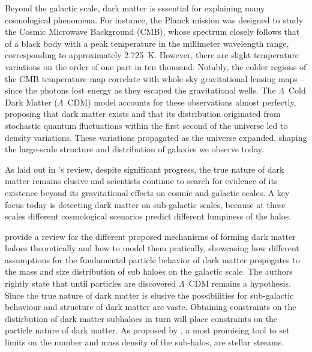 \documentclass{aa}
\begin{document}
  Beyond the galactic scale, dark matter is essential for explaining many cosmological phenomena. For instance, the Planck mission \citep{2020A&A...641A...1P} was designed to study the Cosmic Microwave Background (CMB), whose spectrum closely follows that of a black body with a peak temperature in the millimeter wavelength range, corresponding to approximately 2.725~K. However, there are slight temperature variations on the order of one part in ten thousand. Notably, the colder regions of the CMB temperature map correlate with whole-sky gravitational lensing maps \citep{2020A&A...641A...8P}--since the photons lost energy as they escaped the gravitational wells. The $\Lambda$~Cold Dark Matter ($\Lambda$~CDM) model accounts for these observations almost perfectly, proposing that dark matter exists and that its distribution originated from stochastic quantum fluctuations within the first second of the universe led to density variations. These variations propagated as the universe expanded, shaping the large-scale structure and distribution of galaxies we observe today.

  As laid out in \citet{2021PrPNP.11903865A}'s review, despite significant progress, the true nature of dark matter remains elusive and scientists continue to search for evidence of its existence beyond its gravitational effects on cosmic and galactic scales. A key focus today is detecting dark matter on sub-galactic scales, because at these scales different cosmological scenarios predict different lumpiness of the halos.
    
  \citet{2019Galax...7...81Z} provide a review for the different proposed mechanisms of forming dark matter haloes theoretically and how to model them pratically, showcasing how different assumptions for the fundamental particle behavior of dark matter propogates to the mass and size distribution of sub haloes on the galactic scale. The authors rightly state that until particles are discovered $\Lambda$~CDM remains a hypothesis. Since the true nature of dark matter is elusive the possibilities for sub-galactic behaviour and structure of dark matter are vaste. Obtaining constraints on the distirbution of dark matter subhaloes in turn will place constraints on the particle nature of dark matter. As proposed by \citet{2012ApJ...748...20C}, a most promising tool to set limits on the number and mass density of the sub-halos, are stellar streams. 
\end{document}
